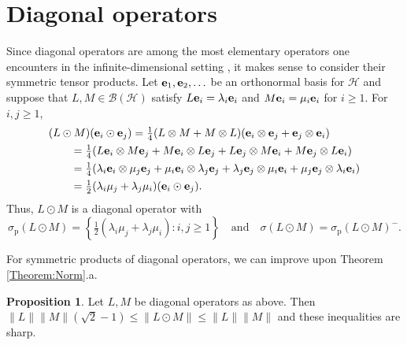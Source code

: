 \documentclass[10pt,reqno]{amsart}
\newcommand{\0}{{\color{lightgray}0}}
\newcommand{\B}{\mathcal{B}}
\renewcommand{\leq}{\leqslant}
\renewcommand{\geq}{\geqslant}
\newcommand{\h}{\mathcal{H}}
\renewcommand{\vec}[1]{{\bf #1}}
\theoremstyle{definition}
\newtheorem{Proposition}[equation]{Proposition}
\numberwithin{equation}{section}
\begin{document}
\section{Diagonal operators}\label{Section:Diagonal}
Since diagonal operators are among the most elementary operators one encounters 
in the infinite-dimensional setting \cite[Ch.~2]{OTBE}, it makes sense to consider their symmetric tensor products.
Let $\vec{e}_1,\vec{e}_2,\ldots$ be an orthonormal basis for $\h$ and suppose that
$L,M \in \B(\h)$ satisfy $L\vec{e}_i = \lambda_i \vec{e}_i$ and $M\vec{e}_i = \mu_i \vec{e}_i$ for $i \geq 1$.  For $i,j\geq 1$,
\begin{align}
&(L \odot M)(\vec{e}_i \odot \vec{e}_j) 
= \tfrac{1}{4}(L \otimes M + M \otimes L)( \vec{e}_i \otimes \vec{e}_j + \vec{e}_j \otimes \vec{e}_i)\\ 
&\qquad= \tfrac{1}{4}(L \vec{e}_i \otimes M  \vec{e}_j + M\vec{e}_i \otimes L\vec{e}_j+  L\vec{e}_j \otimes M\vec{e}_i + M\vec{e}_j \otimes L\vec{e}_i)\\
&\qquad= \tfrac{1}{4}(\lambda_i\vec{e}_i \otimes \mu_j \vec{e}_j+\mu_i \vec{e}_i \otimes \lambda_j\vec{e}_j+  \lambda_j\vec{e}_j \otimes \mu_i\vec{e}_i + \mu_j\vec{e}_j \otimes \lambda_i\vec{e}_i)\\
&\qquad= \tfrac{1}{2}(\lambda_i\mu_j+\lambda_j\mu_i) ( \vec{e}_i \odot \vec{e}_j ).\label{eq:Diagonal}
\end{align}
Thus, $L \odot M$ is a diagonal operator with  
\begin{equation}\label{eq:DiagonalSpectrum}
\sigma_{\textrm{p}}(L \odot M) 
= \left\{\tfrac{1}{2}(\lambda_i\mu_j+\lambda_j\mu_i ): i,j \geq 1 \right\}
\quad \text{and} \quad
\sigma(L \odot M)  = \sigma_{\textrm{p}}(L \odot M)^-.
\end{equation}

For symmetric products of diagonal operators, we can improve upon Theorem \ref{Theorem:Norm}.a.

\begin{Proposition}\label{Proposition:Diagonals}
Let $L,M$ be diagonal operators as above.
Then $ \|L\| \| M \| (\sqrt{2}-1) \leqslant \| L \odot M \| \leq \|L\| \|M\|$ and these inequalities are sharp.
\end{Proposition}
\end{document}
